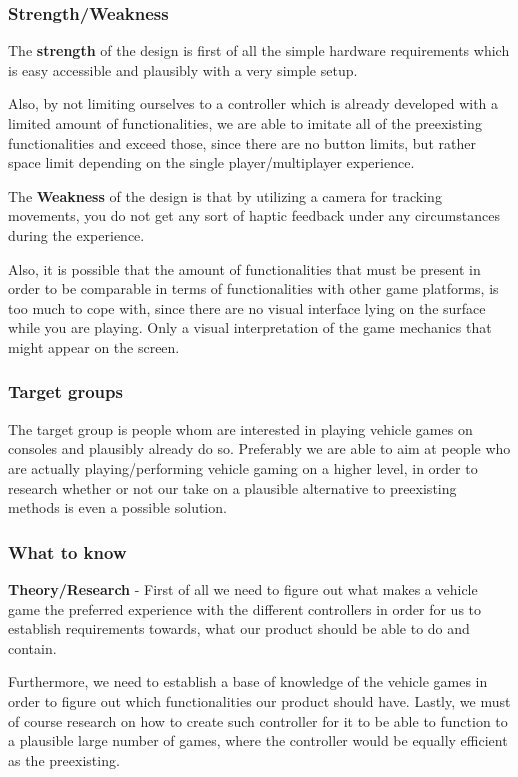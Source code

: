 \subsubsection*{Strength/Weakness}
The \textbf{strength} of the design is first of all the simple hardware requirements which is easy accessible and plausibly with a very simple setup. 
\bigskip

Also, by not limiting ourselves to a controller which is already developed with a limited amount of functionalities, we are able to imitate all of the preexisting functionalities and exceed those, since there are no button limits, but rather space limit depending on the single player/multiplayer experience.
\bigskip

The \textbf{Weakness} of the design is that by utilizing a camera for tracking movements, you do not get any sort of haptic feedback under any circumstances during the experience.
\bigskip

Also, it is possible that the amount of functionalities that must be present in order to be comparable in terms of functionalities with other game platforms, is too much to cope with, since there are no visual interface lying on the surface while you are playing. Only a visual interpretation of the game mechanics that might appear on the screen.

\subsubsection*{Target groups}
The target group is people whom are interested in playing vehicle games on consoles and plausibly already do so. Preferably we are able to aim at people who are actually playing/performing vehicle gaming on a higher level, in order to research whether or not our take on a plausible alternative to preexisting methods is even a possible solution.

\subsubsection*{What to know}
\noindent\textbf{Theory/Research} - First of all we need to figure out what makes a vehicle game the preferred experience with the different controllers in order for us to establish requirements towards, what our product should be able to do and contain.
\bigskip

Furthermore, we need to establish a base of knowledge of the vehicle games in order to figure out which functionalities our product should have. Lastly, we must of course research on how to create such controller for it to be able to function to a plausible large number of games, where the controller would be equally efficient as the preexisting. 
\bigskip

